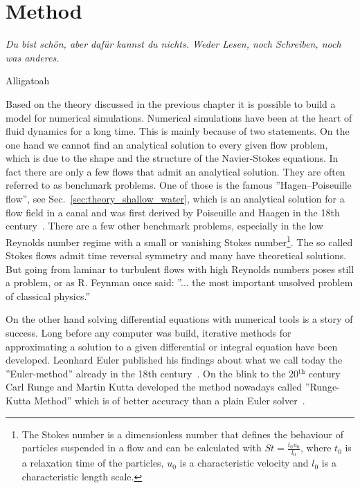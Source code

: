 \chapter{Method}
\label{chapter:method}
\epigraph{\textit{Du bist schön, aber dafür kannst du nichts.
Weder Lesen, noch Schreiben, noch was anderes.}}{Alligatoah}
Based on the theory discussed in the previous chapter it is possible to build a model for numerical simulations.
Numerical simulations have been at the heart of fluid dynamics for a long time.
This is mainly because of two statements.
On the one hand we cannot find an analytical solution to every given flow problem, which is due to the shape and the structure of the Navier-Stokes equations.
In fact there are only a few flows that admit an analytical solution. 
They are often referred to as benchmark problems.
One of those is the famous ''Hagen–Poiseuille flow'', see  Sec.~\ref{sec:theory_shallow_water}, which is an analytical solution for a flow field in a canal and was first derived by Poiseuille and Haagen in the 18th century~\cite{suteraHistoryPoiseuilleLaw}.
There are a few other benchmark problems, especially in the low Reynolds number regime with a small or vanishing Stokes number\footnote{The Stokes number is a dimensionless number that defines the behaviour of particles suspended in a flow and can be calculated with $St = \frac{t_0u_0}{l_0}$, where $t_0$ is a relaxation time of the particles, $u_0$ is a characteristic velocity and $l_0$ is a characteristic length scale.}.
The so called Stokes flows admit time reversal symmetry and many have theoretical solutions.
But going from laminar to turbulent flows with high Reynolds numbers poses still a problem, or as R. Feynman once said: ''... the most important unsolved problem of classical physics.''

On the other hand solving differential equations with numerical tools is a story of success.
Long before any computer was build, iterative methods for approximating a solution to a given differential or integral equation have been developed.
Leonhard Euler published his findings about what we call today the ''Euler-method'' already in the 18th century~\cite{brezinskiNumericalAnalysisHistorical2012}.
On the blink to the 20$^{\text{th}}$ century Carl Runge and Martin Kutta developed the method nowadays called ''Runge-Kutta Method'' which is of better accuracy than a plain Euler solver~\cite{wBeitragZurNaherungsweisen1901, rungeUeberNumerischeAufloesung1895}.

